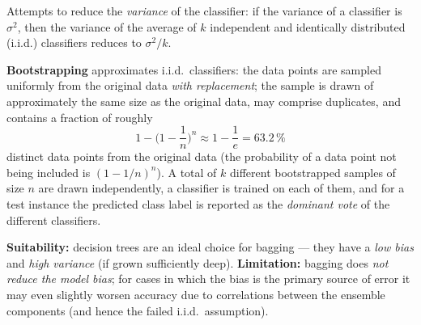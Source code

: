 \documentclass[11pt,a4paper]{article}
\theoremstyle{definition}
\begin{document}
\begin{defbox}
Attempts to reduce the \emph{variance} of the classifier: if the variance of a classifier is
$\sigma^2$, then the variance of the average of $k$ independent and identically distributed
(i.i.d.) classifiers reduces to $\sigma^2/k$.

\textbf{Bootstrapping} approximates i.i.d.\ classifiers: the data points are sampled uniformly
from the original data \emph{with replacement}; the sample is drawn of approximately the same size
as the original data, may comprise duplicates, and contains a fraction of roughly
\[ 1-\Big(1-\frac1n\Big)^{\!n}\approx 1-\frac1e=63.2\,\% \]
distinct data points from the original data (the probability of a data point not being included is
$(1-1/n)^n$). A total of $k$ different bootstrapped samples of size $n$ are drawn independently, a
classifier is trained on each of them, and for a test instance the predicted class label is
reported as the \emph{dominant vote} of the different classifiers.

\textbf{Suitability:} decision trees are an ideal choice for bagging --- they have a \emph{low
bias} and \emph{high variance} (if grown sufficiently deep).
\textbf{Limitation:} bagging does \emph{not reduce the model bias}; for cases in which the bias is
the primary source of error it may even slightly worsen accuracy due to correlations between the
ensemble components (and hence the failed i.i.d.\ assumption).
\end{defbox}
\end{document}
